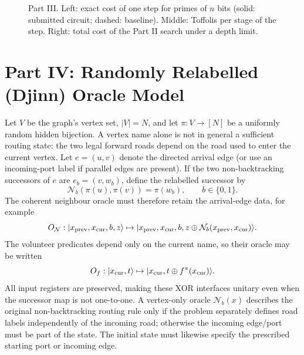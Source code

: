\documentclass[10pt,a4paper]{article}
\begin{document}
\begin{figure}[ht]
\caption{Part III. Left: exact cost of one step for primes of $n$ bits (solid: submitted circuit; dashed: baseline). Middle: Toffolis per stage of the step. Right: total cost of the Part II search under a depth limit.}
\label{fig:p3}
\end{figure}

\section*{Part IV: Randomly Relabelled (Djinn) Oracle Model}
\footnotesize

Let $V$ be the graph's vertex set, $|V|=N$, and let $\pi:V\to[N]$ be a uniformly random hidden bijection. A vertex name alone is not in general a sufficient routing state: the two legal forward roads depend on the road used to enter the current vertex. Let $e=(u,v)$ denote the directed arrival edge (or use an incoming-port label if parallel edges are present). If the two non-backtracking successors of $e$ are $e_b=(v,w_b)$, define the relabelled successor by
\[
\mathcal N_b(\pi(u),\pi(v))=\pi(w_b),\qquad b\in\{0,1\}.
\]
The coherent neighbour oracle must therefore retain the arrival-edge data, for example
\[
O_{\mathcal N}:|x_{\rm prev},x_{\rm cur},b,z\rangle\mapsto
|x_{\rm prev},x_{\rm cur},b,z\oplus\mathcal N_b(x_{\rm prev},x_{\rm cur})\rangle.
\]
The volunteer predicates depend only on the current name, so their oracle may be written
\[
O_f:|x_{\rm cur},t\rangle\mapsto
|x_{\rm cur},t\oplus f^{\pi}(x_{\rm cur})\rangle.
\]
All input registers are preserved, making these XOR interfaces unitary even when the successor map is not one-to-one. A vertex-only oracle $\mathcal N_b(x)$ describes the original non-backtracking routing rule only if the problem separately defines road labels independently of the incoming road; otherwise the incoming edge/port must be part of the state. The initial state must likewise specify the prescribed starting port or incoming edge.
\end{document}
